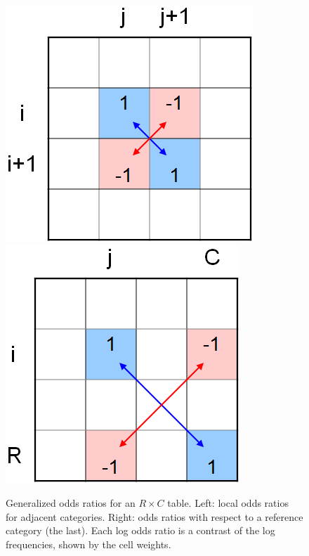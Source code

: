 \documentclass[10pt,krantz2]{krantz}\usepackage[]{graphicx}\usepackage[]{color}
\begin{document}
\begin{figure}
  \hfill
    \includegraphics[height=.35\textwidth,keepaspectratio=true]{ch05/fig/lor1} \hfill
    \includegraphics[height=.35\textwidth,keepaspectratio=true]{ch05/fig/lor2}
  \hfill
    \label{fig:lor}
    \caption{Generalized odds ratios for an $R \times C$ table. Left: local odds ratios for adjacent categories. Right: odds ratios
    with respect to a reference category (the last). Each log odds ratio is a contrast of the log frequencies, shown by the cell weights.}
\end{figure}
\end{document}
